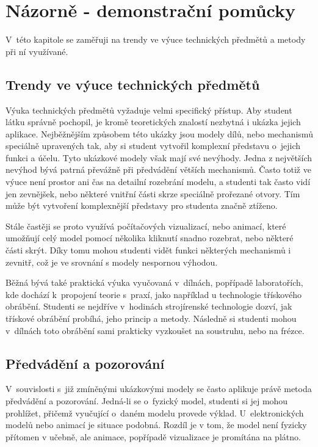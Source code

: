 \chapter{Názorně - demonstrační pomůcky}
V~této kapitole se zaměřuji na trendy ve výuce technických předmětů a metody při ní využívané.

\section{Trendy ve výuce technických předmětů}
Výuka technických předmětů vyžaduje velmi specifický přístup.
Aby student látku správně pochopil, je kromě teoretických znalostí nezbytná i ukázka jejich aplikace.
Nejběžnějším způsobem této ukázky jsou modely dílů, nebo mechanismů speciálně upravených tak, aby si student vytvořil komplexní představu o~jejich funkci a účelu.
Tyto ukázkové modely však mají své nevýhody. 
Jedna z největších nevýhod bývá patrná převážně při předvádění větších mechanismů.
Často totiž ve výuce není prostor ani čas na detailní rozebrání modelu, a studenti tak často vidí jen zevnějšek, nebo některé vnitřní části skrze speciálně prořezané otvory.
Tím může být vytvoření komplexnější představy pro studenta značně ztíženo.

Stále častěji se proto využívá počítačových vizualizací, nebo animací, které umožňují celý model pomocí několika kliknutí snadno rozebrat, nebo některé části skrýt. 
Díky tomu mohou studenti vidět funkci některých mechanismů i zevnitř, což je ve srovnání s modely nespornou výhodou.

Běžná bývá také praktická výuka vyučovaná v~dílnách, popřípadě laboratořích, kde dochází k~propojení teorie s~praxí, jako například u technologie třískového obrábění.
Studenti se nejdříve v~hodinách strojírenské technologie dozví, jak třískové obrábění probíhá, jeho princip a metody.
Následně si studenti mohou v~dílnách toto obrábění sami prakticky vyzkoušet na soustruhu, nebo na frézce.

\section{Předvádění a pozorování}
V~souvislosti s~již zmíněnými ukázkovými modely se často aplikuje právě metoda předvádění a pozorování.
Jedná-li se o~fyzický model, studenti si jej mohou prohlížet, přičemž vyučující o~daném modelu provede výklad.
U~elektronických modelů nebo animací je situace podobná.
Rozdíl je v tom, že model není fyzicky přítomen v učebně, ale animace, popřípadě vizualizace je promítána na plátno.

